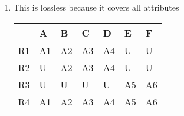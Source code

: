 \documentclass[12pt]{article}
\begin{document}
\begin{enumerate}
\begin{enumerate}
\item %

This is lossless because it covers all attributes

\begin{table}[h]
	\centering
	\begin{tabular}{|l|l|l|l|l|l|l|}
	\hline
	  & A  & B  & C  & D  & E  & F  \\ \hline
	R1 & A1 & A2 & A3 & A4 & U  & U  \\ \hline
	R2 & U  & A2 & A3 & A4 & U  & U  \\ \hline
	R3 & U  & U  & U  & U  & A5 & A6 \\ \hline
	R4 & A1 & A2 & A3 & A4 & A5 & A6 \\ \hline
	\end{tabular}
	\end{table}
	
\end{enumerate}

\end{enumerate}
\end{document}
